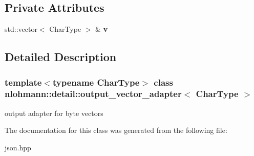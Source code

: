 \subsection*{Private Attributes}
\begin{DoxyCompactItemize}
\item 
\mbox{\label{classnlohmann_1_1detail_1_1output__vector__adapter_a9b1ed9fba14e671ae1abb6692560ef3f}} 
std\+::vector$<$ Char\+Type $>$ \& {\bfseries v}
\end{DoxyCompactItemize}


\subsection{Detailed Description}
\subsubsection*{template$<$typename Char\+Type$>$\newline
class nlohmann\+::detail\+::output\+\_\+vector\+\_\+adapter$<$ Char\+Type $>$}

output adapter for byte vectors 

The documentation for this class was generated from the following file\+:\begin{DoxyCompactItemize}
\item 
json.\+hpp\end{DoxyCompactItemize}
